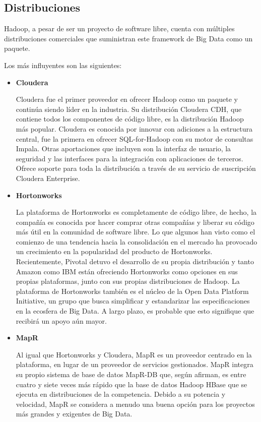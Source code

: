\subsection{Distribuciones}

Hadoop, a pesar de ser un proyecto de software libre, cuenta con múltiples distribuciones comerciales que suministran este framework de Big Data como un paquete.  

Los más influyentes son las siguientes: 
\begin{itemize}
    \item \textbf{Cloudera}\cite{cloudera}

Cloudera fue el primer proveedor en ofrecer Hadoop como un paquete y continúa siendo líder en la industria. Su distribución Cloudera CDH, que contiene todos los componentes de código libre, es la distribución Hadoop más popular. Cloudera es conocida por innovar con adiciones a la estructura central, fue la primera en ofrecer SQL-for-Hadoop con su motor de consultas Impala. Otras aportaciones que incluyen son la interfaz de usuario, la seguridad y las interfaces para la integración con aplicaciones de terceros. Ofrece soporte para toda la distribución a través de su servicio de suscripción Cloudera Enterprise. 

    \item \textbf{Hortonworks}\cite{hortonworks}

La plataforma de Hortonworks es completamente de código libre,  de hecho, la compañía es conocida por hacer comprar otras compañías y liberar su código más útil en la comunidad de software libre. Lo que algunos han visto como el comienzo de una tendencia hacia la consolidación en el mercado ha provocado un crecimiento en la popularidad del producto de Hortonworks. Recientemente, Pivotal detuvo el desarrollo de su propia distribución y tanto Amazon como IBM están ofreciendo Hortonworks como opciones en sus propias plataformas, junto con sus propias distribuciones de Hadoop. La plataforma de Hortonworks también es el núcleo de la Open Data Platform Initiative, un grupo que busca simplificar y estandarizar las especificaciones en la ecosfera de Big Data. A largo plazo, es probable que esto signifique que recibirá un apoyo aún mayor.   

    \item \textbf{MapR}\cite{mapr}                              

Al igual que Hortonworks y Cloudera, MapR es un proveedor centrado en la plataforma, en lugar de un proveedor de servicios gestionados. MapR integra su propio sistema de base de datos MapR-DB que, según afirman, es entre cuatro y siete veces más rápido que la base de datos Hadoop HBase que se ejecuta en distribuciones de la competencia. Debido a su potencia y velocidad, MapR se considera a menudo una buena opción para los proyectos más grandes y exigentes de Big Data. 


\end{itemize}
